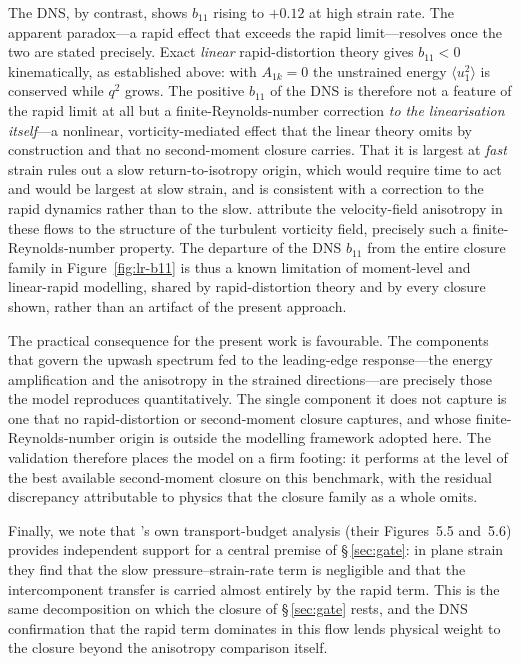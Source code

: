 \documentclass[lineno]{JFM-FLM_Au}
\begin{document}
The DNS, by contrast, shows $b_{11}$ rising to $+0.12$ at high strain rate. The
apparent paradox---a rapid effect that exceeds the rapid limit---resolves once
the two are stated precisely. Exact \emph{linear} rapid-distortion theory gives
$b_{11}<0$ kinematically, as established above: with $A_{1k}=0$ the unstrained
energy $\langle u_1^2\rangle$ is conserved while $q^2$ grows. The positive
$b_{11}$ of the DNS is therefore not a feature of the rapid limit at all but a
finite-Reynolds-number correction \emph{to the linearisation itself}---a
nonlinear, vorticity-mediated effect that the linear theory omits by
construction and that no second-moment closure carries. That it is largest at
\emph{fast} strain rules out a slow return-to-isotropy origin, which would
require time to act and would be largest at slow strain, and is consistent with a
correction to the rapid dynamics rather than to the slow. \citet{LeeReynolds1985}
attribute the velocity-field anisotropy in these flows to the structure of the
turbulent vorticity field, precisely such a finite-Reynolds-number property. The
departure of the DNS $b_{11}$ from the entire closure family in
Figure~\ref{fig:lr-b11} is thus a known limitation of moment-level and
linear-rapid modelling, shared by rapid-distortion theory and by every closure
shown, rather than an artifact of the present approach.

The practical consequence for the present work is favourable. The components that
govern the upwash spectrum fed to the leading-edge response---the energy
amplification and the anisotropy in the strained directions---are precisely those
the model reproduces quantitatively. The single component it does not capture is
one that no rapid-distortion or second-moment closure captures, and whose
finite-Reynolds-number origin is outside the modelling framework adopted here. The
validation therefore places the model on a firm footing: it performs at the level
of the best available second-moment closure on this benchmark, with the residual
discrepancy attributable to physics that the closure family as a whole omits.

Finally, we note that \citeauthor{LeeReynolds1985}'s own transport-budget analysis
(their Figures~5.5 and~5.6) provides independent support for a central premise of
\S\,\ref{sec:gate}: in plane strain they find that the slow pressure--strain-rate
term is negligible and that the intercomponent transfer is carried almost entirely
by the rapid term. This is the same decomposition on which the closure of
\S\,\ref{sec:gate} rests, and the DNS confirmation that the rapid term dominates in
this flow lends physical weight to the closure beyond the anisotropy comparison
itself.
\end{document}
